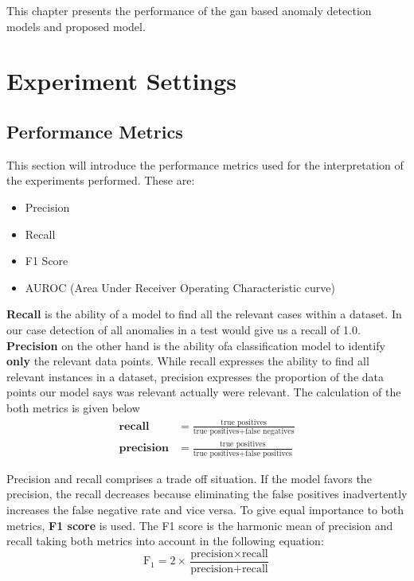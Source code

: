 
\begingroup

This chapter presents the performance of the gan based anomaly detection models and proposed model. 


\section{Experiment Settings}




\subsection{Performance Metrics}
This section will introduce the performance metrics used for the interpretation of the experiments performed.
These are:
\begin{itemize}
	\item Precision
	\item Recall
	\item F1 Score
	\item AUROC (Area Under Receiver Operating Characteristic curve)
\end{itemize}

 \textbf{Recall} is the ability of a model to find all the relevant cases within a dataset. In our case detection 
of all anomalies in a test would give us a recall of 1.0. \textbf{Precision} on the other hand is the ability 
ofa classification model to identify \textbf{only} the relevant data points. While recall expresses 
the ability to find all relevant instances in a dataset, precision expresses the proportion of the 
data points our model says was relevant actually were relevant. The calculation of the both metrics 
is given below
\begin{align}
\textbf{recall} & = \frac{\text{true positives}}{\text{true positives} + \text{false negatives}} \\[5pt]
\textbf{precision} & = \frac{\text{true positives}}{\text{true positives} + \text{false positives}}
\end{align}

Precision and recall comprises a trade off situation. If the model favors the precision, the recall 
decreases because eliminating the false positives inadvertently increases the false negative rate and 
vice versa. To give equal importance to both metrics, \textbf{F1 score} is used. The F1 score is the 
harmonic mean of precision and recall taking both metrics into account in the following equation:
\begin{equation}
\text{F}_{1} = 2 \times \frac{\text{precision} \times \text{recall}}{\text{precision} + \text{recall}}
\end{equation}

